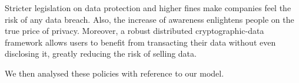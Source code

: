 \documentclass{icmmcm}
\begin{document}
\begin{summary}
Stricter legislation on data protection and higher fines make companies feel the risk of any data breach. Also, the increase of awareness enlightens people on the true price of privacy. Moreover, a robust distributed cryptographic-data framework allows users to benefit from transacting their data without even disclosing it, greatly reducing the risk of selling data.

We then analysed these policies with reference to our model.







  
  
  


\end{summary}
\end{document}
